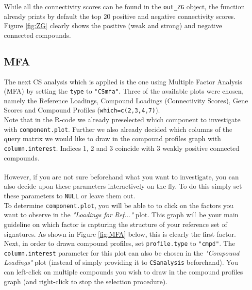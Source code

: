 \documentclass[a4paper]{article}\usepackage[]{graphicx}\usepackage[]{color}
\begin{document}
\noindent While all the connectivity scores can be found in the \texttt{out\_ZG}
object, the function already prints by default the top 20 positive and negative
connectivity scores. Figure \ref{fig:ZG} clearly shows the positive (weak and
strong) and negative connected compounds.

\subsection{MFA}
The next CS analysis which is applied is the one using Multiple Factor Analysis
(MFA) by setting the \texttt{type} to \texttt{"CSmfa"}. Three of the
available plots were chosen, namely the Reference Loadings,
Compound Loadings (Connectivity Scores), Gene Scores and Compound Profiles
(\texttt{which=c(2,3,4,7)}).\\
Note that in the R-code we already preselected which component to investigate
with \texttt{component.plot}.
Further we also already decided which columns of the query matrix we would like
to draw in the compound profiles graph with \texttt{column.interest}. Indices 1, 2 and 3 coincide
with 3 weakly positive connected compounds.\\ \\
However, if you are not sure beforehand what you want to investigate, you can
also decide upon these parameters interactively on the fly.  To do this simply
set these parameters to \texttt{NULL} or leave them out.\\
To determine \texttt{component.plot}, you will be able to to click on the
factors you want to observe in the {\it "Loadings for Ref..."} plot. This graph will be
your main guideline on which factor is capturing the structure of your reference
set of signatures. As shown in Figure \ref{fig:MFA} below, this is clearly the
first factor. \\
Next, in order to drawn compound profiles, set \texttt{profile.type} to
\texttt{"cmpd"}. The \texttt{column.interest} parameter for this plot can also
be chosen in the {\it "Compound Loadings"} plot (instead of simply providing it
to \texttt{CSanalysis} beforehand). You can left-click on multiple compounds you wish to draw in the compound profiles graph (and right-click to stop the selection procedure). 
\end{document}
